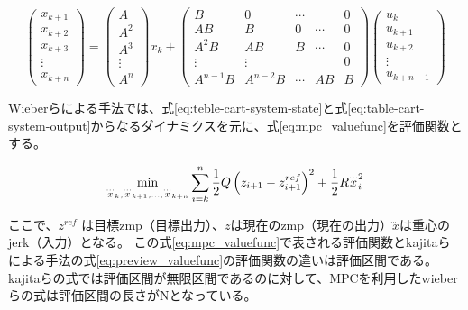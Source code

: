 \begin{equation}
  \begin{pmatrix}
    x_{k+1} \\x_{k+2}\\x_{k+3}\\
    \vdots  \\ x_{k+n}
  \end{pmatrix}
  =
  \begin{pmatrix}
    A      \\A^2\\A^3\\
    \vdots \\ A^n
  \end{pmatrix}
  x_{k} +
  \begin{pmatrix}
    B        & 0        & \cdots &        & 0 \\
    AB       & B        & 0      & \cdots & 0 \\
    A^2B     & AB       & B      & \cdots & 0 \\
    \vdots   & \vdots   &        &        & 0 \\
    A^{n-1}B & A^{n-2}B & \cdots & AB     & B
  \end{pmatrix}
  \begin{pmatrix}
    u_{k}   \\
    u_{k+1} \\
    u_{k+2} \\
    \vdots  \\
    u_{k+n-1}
  \end{pmatrix}
  \label{eq:mpc-preview}
\end{equation}

Wieberらによる手法\cite{WIEBER}では、式\eqref{eq:teble-cart-system-state}と式\eqref{eq:table-cart-system-output}からなるダイナミクスを元に、式\eqref{eq:mpc_valuefunc}を評価関数とする。

\begin{equation}
  \min_{{\buildrel\ldots\over{x}}_{k},{\buildrel\ldots\over{x}}_{k+1},\ldots,{\buildrel\ldots\over{x}}_{k+n}}\sum_{i=k}^{n}{1\over 2}Q\left(z_{i+1}-z_{i+1}^{ref}\right)^{2}+{1\over 2}R{\buildrel\ldots\over{x}}_{i}^{2}
  \label{eq:mpc_valuefunc}
\end{equation}

ここで、$z^{ref}$ は目標zmp（目標出力）、$z$は現在のzmp（現在の出力）$\dddot{x}$は重心のjerk（入力）となる。
この式\eqref{eq:mpc_valuefunc}で表される評価関数とkajitaらによる手法の式\eqref{eq:preview_valuefunc}の評価関数の違いは評価区間である。
kajitaらの式では評価区間が無限区間であるのに対して、MPCを利用したwieberらの式は評価区間の長さがNとなっている。

